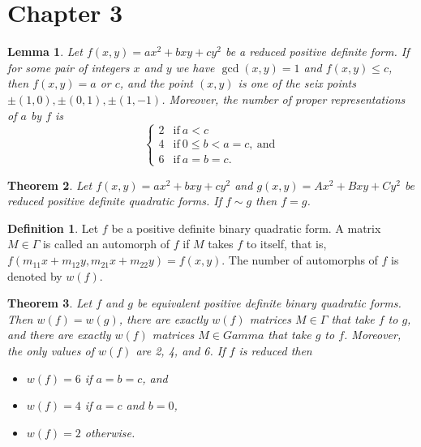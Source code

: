 \documentclass{amsart}
\newcounter{chapter}
\newtheorem{theorem}{Theorem}[chapter]
\newtheorem{lemma}[theorem]{Lemma}
\theoremstyle{definition}
\newtheorem*{definition*}{Definition}
\begin{document}
\setcounter{theorem}{23}

\section*{Chapter 3}

\begin{lemma}
  Let $f(x,y) = ax^2 + bxy + cy^2$ be a reduced positive definite form.
  If for some pair of integers $x$ and $y$ we have $\gcd(x,y) = 1$
  and $f(x,y) \leq c$, then $f(x,y) = a$ or $c$, and the point
  $(x,y)$ is one of the seix points
  $\pm(1,0), \pm(0,1), \pm (1,-1)$.
  Moreover, the number of proper representations of $a$ by $f$ is
  \[
    \begin{cases}
      2 & \text{if}\ a < c \\
      4 & \text{if}\ 0 \leq b < a = c,\ \text{and} \\
      6 & \text{if}\ a = b = c.
    \end{cases}
  \]
\end{lemma}

\begin{theorem}
  Let $f(x,y) = ax^2 + bxy + cy^2$ and 
  $g(x,y) = Ax^2 + Bxy + Cy^2$ be reduced positive definite quadratic forms.
  If $f \sim g$  then $f = g$.
\end{theorem}

\begin{definition*}
  Let $f$ be a positive definite binary quadratic form.
  A matrix $M \in \Gamma$ is called an automorph of $f$ if
  $M$ takes $f$ to itself, that is, 
  $f(m_{11}x + m_{12}y, m_{21}x + m_{22}y) = f(x,y)$.
  The number of automorphs of $f$ is denoted by
  $w(f)$.
\end{definition*}

\begin{theorem}
  Let $f$ and $g$ be equivalent positive definite binary quadratic 
  forms.
  Then $w(f) = w(g)$, there are exactly $w(f)$ matrices $M \in \Gamma$
  that take $f$ to $g$, and there are exactly $w(f)$ matrices $M \in Gamma$
  that take $g$ to $f$. 
  Moreover, the only values of $w(f)$ are 2, 4, and 6. 
  If $f$ is reduced then 
  \begin{itemize}
    \item[] $w(f) = 6$ if $a = b =  c$, and 
    \item[] $w(f) = 4$ if $a = c$ and $b = 0$,
    \item[] $w(f) = 2$ otherwise.
  \end{itemize}
\end{theorem}
\end{document}
